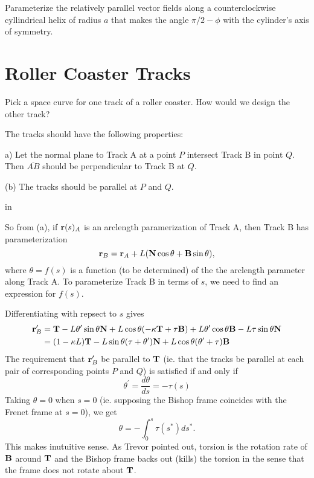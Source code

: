 \documentclass{ximera}
\newcommand{\pskip}{\vskip 0.1 in}
\begin{document}
\begin{exercise}  \label{E:MDnfddd}
Parameterize the relatively parallel vector fields along a counterclockwise cyllindrical helix of radius $a$ that makes the angle $\pi/2 - \phi$ with the cylinder's axis of symmetry.
\end{exercise}




\section*{Roller Coaster Tracks}
Pick a space curve for one track of a roller coaster. How would we design the other track?

The tracks should have the following properties:

a) Let the normal plane to Track A at a point $P$ intersect Track B in point $Q$. Then $\overline{AB}$ should be perpendicular to Track B at $Q$.

(b) The tracks should be parallel at $P$ and $Q$.

\pskip

So from (a), if ${\bf r}(s)_A$ is an arclength paramerization of Track A, then Track B has parameterization
\[
      {\bf r}_B = {\bf r}_A + L ( {\bf N} \cos\theta  + {\bf B} \sin\theta ) ,
\]
where $\theta = f(s)$ is a function (to be determined) of the the arclength parameter along Track A. To parameterize Track B in terms of $s$, we need to find an expression for $f(s)$.
 
Differentiating with repsect to $s$ gives
\begin{align*}
      {\bf r}_B^\prime &= {\bf T} -L\theta^\prime \sin\theta {\bf N} + L\cos\theta (-\kappa {\bf T} + \tau {\bf B}) + L\theta^\prime\cos\theta {\bf B} -L\tau \sin\theta {\bf N}   \\
                                 &= (1-\kappa L){\bf T} - L\sin\theta(\tau +\theta^\prime){\bf N} + L \cos\theta (\theta^\prime + \tau){\bf B}
\end{align*}
The requirement that ${\bf r}_B^\prime$ be parallel to ${\bf T}$ (ie. that the tracks be parallel at each pair of corresponding points $P$ and $Q$) is satisfied if and only if
\[
  \theta^\prime = \frac{d\theta}{ds} = -\tau(s)
\]
Taking $\theta = 0$ when $s=0$ (ie. supposing the Bishop frame coincides with the Frenet frame at $s=0$), we get
\[
        \theta = - \int_0^s \tau(s^*) ds^* . 
\]
This makes inutuitive sense. As Trevor pointed out, torsion is the rotation rate of ${\bf B}$ around ${\bf T}$ and the Bishop frame backs out (kills) the torsion in the sense that the frame does not rotate about ${\bf T}$.
\end{document}
